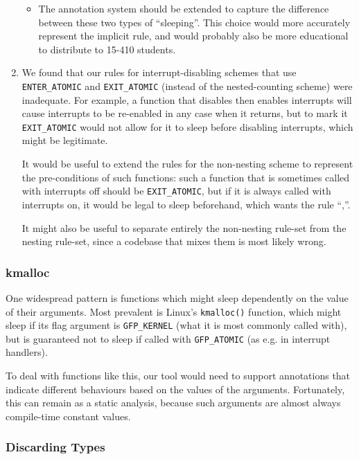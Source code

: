\documentclass{article}
\begin{document}
\begin{enumerate}
\begin{itemize}
			\item The annotation system should be extended to capture the difference between these two types of ``sleeping''. This choice would more accurately represent the implicit rule, and would probably also be more educational to distribute to 15-410 students.
		\end{itemize}
	\item
		We found that our rules for interrupt-disabling schemes that use \texttt{ENTER\_ATOMIC} and \texttt{EXIT\_ATOMIC} (instead of the nested-counting scheme) were inadequate. For example, a function that disables then enables interrupts will cause interrupts to be re-enabled in any case when it returns, but to mark it \texttt{EXIT\_ATOMIC} would not allow for it to sleep before disabling interrupts, which might be legitimate.

		It would be useful to extend the rules for the non-nesting scheme to represent the pre-conditions of such functions: such a function that is sometimes called with interrupts off should be \texttt{EXIT\_ATOMIC}, but if it is always called with interrupts on, it would be legal to sleep beforehand, which wants the rule ``,\Enable''.

		It might also be useful to separate entirely the non-nesting rule-set from the nesting rule-set, since a codebase that mixes them is most likely wrong.
\end{enumerate}

\subsubsection{kmalloc}

One widespread pattern is functions which might sleep dependently on the value of their arguments.
Most prevalent is Linux's \texttt{kmalloc()} function, which might sleep if its flag argument is \texttt{GFP\_KERNEL} (what it is most commonly called with), but is guaranteed not to sleep if called with \texttt{GFP\_ATOMIC} (as e.g. in interrupt handlers).

To deal with functions like this, our tool would need to support annotations that indicate different behaviours based on the values of the arguments.
Fortunately, this can remain as a static analysis, because such arguments are almost always compile-time constant values.

\subsubsection{Discarding Types}
\end{document}
